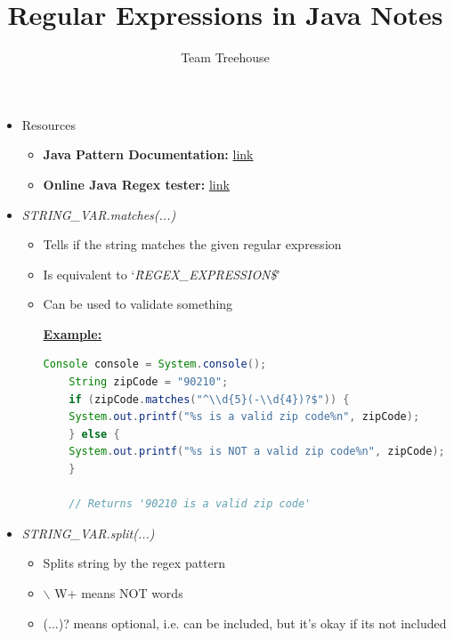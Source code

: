 \documentclass[12pt]{article}
\begin{document}
\title{Regular Expressions in Java Notes}
\author{Team Treehouse}
\maketitle

\begin{itemize}
    \item Resources
    \begin{itemize}
        \item \textbf{Java Pattern Documentation:} \href{https://docs.oracle.com/javase/8/docs/api/java/util/regex/Pattern.html}{link}
        \item \textbf{Online Java Regex tester:} \href{https://www.freeformatter.com/java-regex-tester.html}{link}
    \end{itemize}
    \item \textit{STRING\_VAR.matches(...)}
    \begin{itemize}
        \item Tells if the string matches the given regular expression
        \item Is equivalent to `\textit{\^REGEX\_EXPRESSION\$}'
        \item Can be used to validate something

        \bigskip

        \underline{\textbf{Example:}}

        \bigskip

    \begin{lstlisting}[language=Java, caption={demo/Explore1.java}]
    Console console = System.console();
    String zipCode = "90210";
    if (zipCode.matches("^\\d{5}(-\\d{4})?$")) {
    System.out.printf("%s is a valid zip code%n", zipCode);
    } else {
    System.out.printf("%s is NOT a valid zip code%n", zipCode);
    }

    // Returns '90210 is a valid zip code'
    \end{lstlisting}

    \end{itemize}

    \item \textit{STRING\_VAR.split(...)}
    \begin{itemize}
        \item Splits string by the regex pattern
        \item $\backslash$ W+ means NOT words
        \item (...)? means optional, i.e. can be included, but it's okay if its
        not included


\end{itemize}
\end{itemize}
\end{document}
